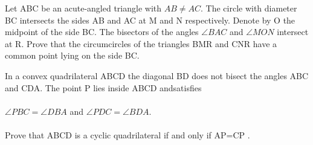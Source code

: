 \item Let ABC be an acute-angled triangle with $AB \neq AC$. The circle with diameter BC intersects the sides AB and AC at M and N respectively. Denote by O the midpoint of the side BC. The bisectors of the angles $\angle BAC$ and $\angle MON$ intersect at R. Prove that the circumcircles of the triangles BMR and CNR have a common point lying on the side BC.\\

\item In a convex quadrilateral ABCD the diagonal BD does not bisect the angles ABC and CDA. The point P lies inside ABCD andsatisfies\\
 \\$\angle PBC = \angle DBA$ and $\angle PDC = \angle BDA$.\\
\\Prove that ABCD is a cyclic quadrilateral if and only if AP=CP .


